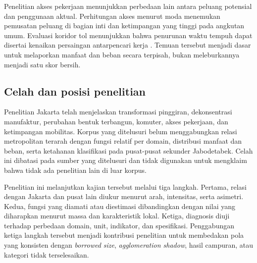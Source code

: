 \documentclass[12pt,a4paper,oneside,openany,indonesian]{report}
\begin{document}
Penelitian akses pekerjaan menunjukkan perbedaan lain antara peluang potensial dan penggunaan aktual. Perhitungan akses menurut moda menemukan pemusatan peluang di bagian inti dan ketimpangan yang tinggi pada angkutan umum. Evaluasi koridor tol menunjukkan bahwa penurunan waktu tempuh dapat disertai kenaikan persaingan antarpencari kerja \parencite{andani2025,andani2021}. Temuan tersebut menjadi dasar untuk melaporkan manfaat dan beban secara terpisah, bukan meleburkannya menjadi satu skor bersih.

\subsection{Celah dan posisi penelitian}

Penelitian Jakarta telah menjelaskan transformasi pinggiran, dekonsentrasi manufaktur, perubahan bentuk terbangun, komuter, akses pekerjaan, dan ketimpangan mobilitas. Korpus yang ditelusuri belum menggabungkan relasi metropolitan terarah dengan fungsi relatif per domain, distribusi manfaat dan beban, serta ketahanan klasifikasi pada pusat-pusat sekunder Jabodetabek. Celah ini dibatasi pada sumber yang ditelusuri dan tidak digunakan untuk mengklaim bahwa tidak ada penelitian lain di luar korpus.

Penelitian ini melanjutkan kajian tersebut melalui tiga langkah. Pertama, relasi dengan Jakarta dan pusat lain diukur menurut arah, intensitas, serta asimetri. Kedua, fungsi yang diamati atau diestimasi dibandingkan dengan nilai yang diharapkan menurut massa dan karakteristik lokal. Ketiga, diagnosis diuji terhadap perbedaan domain, unit, indikator, dan spesifikasi. Penggabungan ketiga langkah tersebut menjadi kontribusi penelitian untuk membedakan pola yang konsisten dengan \textit{borrowed size}, \textit{agglomeration shadow}, hasil campuran, atau kategori tidak terselesaikan.
\end{document}
